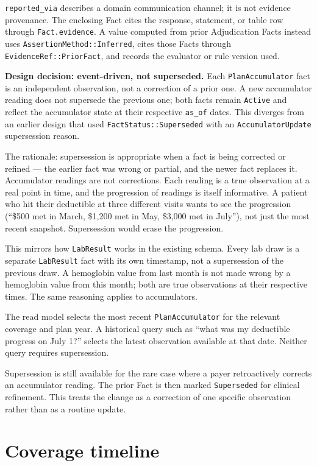 \documentclass[11pt]{article}
\begin{document}
\texttt{reported\_via} describes a domain communication channel; it is not
evidence provenance. The enclosing Fact cites the response, statement, or
table row through \texttt{Fact.evidence}. A value computed from prior
Adjudication Facts instead uses \texttt{AssertionMethod::Inferred}, cites
those Facts through \texttt{EvidenceRef::PriorFact}, and records the evaluator
or rule version used.

\textbf{Design decision: event-driven, not superseded.} Each
\texttt{PlanAccumulator} fact is an independent observation, not a
correction of a prior one. A new accumulator reading does not supersede
the previous one; both facts remain \texttt{Active} and reflect the
accumulator state at their respective \texttt{as\_of} dates. This
diverges from an earlier design that used
\texttt{FactStatus::Superseded} with an \texttt{AccumulatorUpdate}
supersession reason.

The rationale: supersession is appropriate when a fact is being
corrected or refined --- the earlier fact was wrong or partial, and the
newer fact replaces it. Accumulator readings are not corrections. Each
reading is a true observation at a real point in time, and the
progression of readings is itself informative. A patient who hit their
deductible at three different visits wants to see the progression
(``\$500 met in March, \$1{,}200 met in May, \$3{,}000 met in July''),
not just the most recent snapshot. Supersession would erase the
progression.

This mirrors how \texttt{LabResult} works in the existing schema. Every
lab draw is a separate \texttt{LabResult} fact with its own timestamp,
not a supersession of the previous draw. A hemoglobin value from last
month is not made wrong by a hemoglobin value from this month; both
are true observations at their respective times. The same reasoning
applies to accumulators.

The read model selects the most recent \texttt{PlanAccumulator} for the
relevant coverage and plan year. A historical query such as ``what was my
deductible progress on July 1?'' selects the latest observation available at
that date. Neither query requires supersession.

Supersession is still available for the rare case where a payer
retroactively corrects an accumulator reading. The prior Fact is then marked
\texttt{Superseded} for clinical refinement. This treats the change as a
correction of one specific observation rather than as a routine update.

\section{Coverage timeline}
\label{sec:coverage-timeline}
\end{document}

